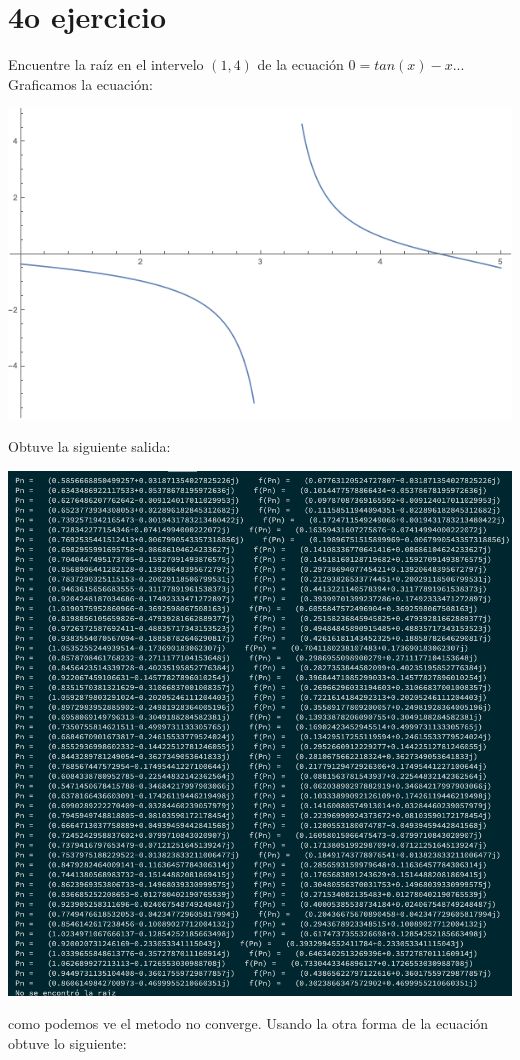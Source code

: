 \documentclass{article}
\begin{document}
\section{4o ejercicio}
Encuentre la raíz en el intervelo $(1,4)$ de la ecuación $0=tan(x) -x$...
Graficamos la ecuación:
\begin{center}
    \includegraphics[scale=0.5]{graficaTan.png}    
\end{center}
Obtuve la siguiente salida: 
\begin{center}
    \includegraphics[scale=0.3]{salidaMuller1.png}    
\end{center}
como podemos ve el metodo no converge.
Usando la otra forma de la ecuación obtuve lo siguiente:
\end{document}

